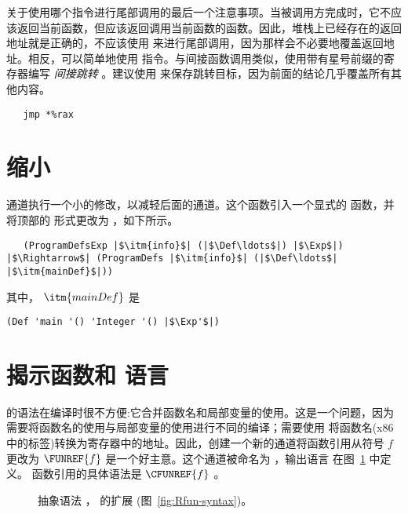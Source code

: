 \documentclass[11pt]{book}
\newcommand{\gray}[1]{{\color{gray} #1}}
\begin{document}
关于使用哪个指令进行尾部调用的最后一个注意事项。当被调用方完成时，它不应该返回当前函数，但应该返回调用当前函数的函数。因此，堆栈上已经存在的返回地址就是正确的，不应该使用  来进行尾部调用，因为那样会不必要地覆盖返回地址。相反，可以简单地使用  指令。与间接函数调用类似，使用带有星号前缀的寄存器编写 \emph{间接跳转} 。建议使用  来保存跳转目标，因为前面的结论几乎覆盖所有其他内容。
\begin{lstlisting}
   jmp *%rax
\end{lstlisting}

\section{缩小 \LangFun{}}
\label{sec:shrink-r4}

  通道执行一个小的修改，以减轻后面的通道。这个函数引入一个显式的  函数，并将顶部的  形式更改为
 ，如下所示。
\begin{lstlisting}
   (ProgramDefsExp |$\itm{info}$| (|$\Def\ldots$|) |$\Exp$|)
|$\Rightarrow$| (ProgramDefs |$\itm{info}$| (|$\Def\ldots$| |$\itm{mainDef}$|))
\end{lstlisting}
其中， $\itm{mainDef}$ 是
\begin{lstlisting}
(Def 'main '() 'Integer '() |$\Exp'$|)
\end{lstlisting}


\section{揭示函数和 \LangFunRef{} 语言}
\label{sec:reveal-functions-r4}

 \LangFun{} 的语法在编译时很不方便:它合并函数名和局部变量的使用。这是一个问题，因为需要将函数名的使用与局部变量的使用进行不同的编译；需要使用  将函数名(x86中的标签)转换为寄存器中的地址。因此，创建一个新的通道将函数引用从符号 $f$ 更改为
$\FUNREF{f}$ 是一个好主意。这个通道被命名为  ，输出语言 \LangFunRef{} 在图~\ref{fig:f1-syntax} 中定义。
函数引用的具体语法是 $\CFUNREF{f}$ 。

\begin{figure}[tp]
\centering
\fbox{
\begin{minipage}{0.96\textwidth}
\[
\begin{array}{lcl}
\Exp &::=& \ldots \mid \FUNREF{\Var}\\
 \Def &::=& \gray{ \FUNDEF{\Var}{([\Var \code{:} \Type]\ldots)}{\Type}{\code{'()}}{\Exp} }\\
  \LangFunRef{} &::=& \PROGRAMDEFS{\code{'()}}{\LP \Def\ldots \RP}
\end{array}
\]
\end{minipage}
}
\caption{抽象语法 \LangFunRef{} ， \LangFun{} 的扩展
  (图~\ref{fig:Rfun-syntax})。}
\label{fig:f1-syntax}
\end{figure}
\end{document}

